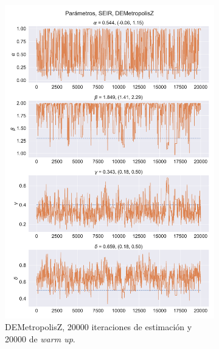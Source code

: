 \begin{figure}[h]
    \centering
    \begin{subfigure}[b]{0.49\linewidth}
        \centering
        \includegraphics[width=\linewidth]{img/content/chapter4/DEMetropolis_seir_params_trace.pdf}
        \caption{DEMetropolisZ, 20000 iteraciones de estimación y 20000 de \textit{warm up}.}
        \label{fig:NUTS_seir_params_trace}
    \end{subfigure}
    \begin{subfigure}[b]{0.49\linewidth}
        \centering

\end{subfigure}
\end{figure}
